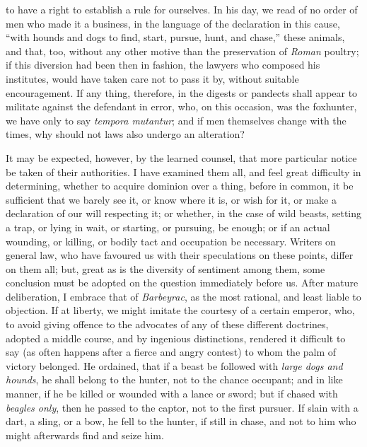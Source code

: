 to have a right to establish a rule for ourselves. In his day, we read of no
order of men who made it a business, in the language of the declaration in this
cause, ``with hounds and dogs to find, start, pursue, hunt, and chase,'' these
animals, and that, too, without any other motive than the preservation of
\textit{Roman} poultry; if this diversion had been then in fashion, the lawyers
who composed his institutes, would have taken care not to pass it by, without
suitable encouragement. If any thing, therefore, in the digests or pandects
shall appear to militate against the defendant in error, who, on this occasion,
was the foxhunter, we have only to say \textit{tempora
mutantur}; and if men themselves change with
the times, why should not laws also undergo an alteration?

It may be expected, however, by the learned counsel, that more particular notice
be taken of their authorities. I have examined them all, and feel great
difficulty in determining, whether to acquire dominion over a thing, before in
common, it be sufficient that we barely see it, or know where it is, or wish for
it, or make a declaration of our will respecting it; or whether, in the case of
wild beasts, setting a trap, or lying in wait, or starting, or pursuing, be
enough; or if an actual wounding, or killing, or bodily tact and occupation be
necessary. Writers on general law, who have favoured us with their speculations
on these points, differ on them all; but, great as is the diversity of sentiment
among them, some conclusion must be adopted on the question immediately before
us. After mature deliberation, I embrace that of \textit{Barbeyrac}, as the most
rational, and least liable to objection. If at liberty, we might imitate the
courtesy of a certain emperor, who, to avoid giving offence to the advocates of
any of these different doctrines, adopted a middle course, and by ingenious
distinctions, rendered it difficult to say (as often happens after a fierce and
angry contest) to whom the palm of victory belonged. He ordained, that if a
beast be followed with \textit{large dogs and hounds}, he shall belong to the
hunter, not to the chance occupant; and in like manner, if he be killed or
wounded with a lance or sword; but if chased with \textit{beagles only}, then he
passed to the captor, not to the first pursuer. If slain with a dart, a sling,
or a bow, he fell to the hunter, if still in chase, and not to him who might
afterwards find and seize him.

